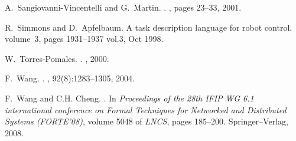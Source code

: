 \documentclass[10pt, a4paper, onecolumn, conference, compsocconf]{IEEEtran}
\begin{document}
\begin{thebibliography}{10}
A.~Sangiovanni-Vincentelli and G.~Martin.
.
, pages 23--33, 2001.

R.~Simmons and D.~Apfelbaum.
\newblock A task description language for robot control.
\newblock volume~3, pages 1931--1937 vol.3, Oct 1998.

W.~Torres-Pomales.
.
, 2000.

F.~Wang.
.
, 92(8):1283--1305, 2004.

F.~Wang and C.H. Cheng.
.
\newblock In {\em Proceedings of the 28th IFIP WG 6.1 international conference
  on Formal Techniques for Networked and Distributed Systems (FORTE'08)},
  volume 5048 of {\em LNCS}, pages 185--200. Springer--Verlag, 2008.

\end{thebibliography}
\end{document}
